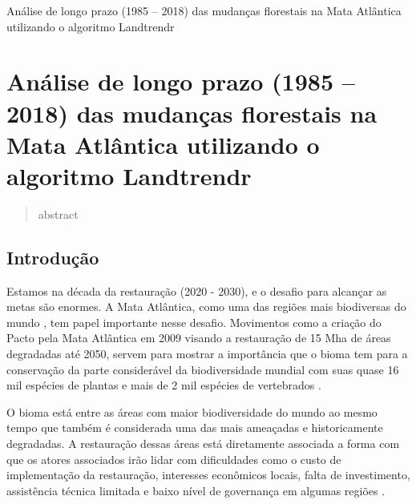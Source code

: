 \begin{titlepage}
    \centering
    \vspace*{\fill}

    \vspace*{0.5cm}

    \Large%
    Análise de longo prazo (1985 – 2018) das mudanças florestais na Mata Atlântica utilizando o algoritmo Landtrendr

    \vspace*{5cm}


    \vspace*{\fill}
\end{titlepage}

\section{Análise de longo prazo (1985 – 2018) das mudanças florestais na Mata Atlântica utilizando o algoritmo Landtrendr}

\begin{abstract}
    abstract
\end{abstract}

\subsection{Introdução}
\hspace{13pt} Estamos na década da restauração (2020 - 2030), e o desafio para alcançar as metas são enormes. A Mata Atlântica, como uma das regiões mais biodiversas do mundo \citep{REZENDE2018208}, tem papel importante nesse desafio. Movimentos como a criação do Pacto pela Mata Atlântica em 2009 visando a restauração de 15 Mha de áreas degradadas até 2050, servem para mostrar a importância que o bioma tem para a conservação da parte considerável da biodiversidade mundial com suas quase 16 mil espécies de plantas e mais de 2 mil espécies de vertebrados \citep{scarano2014}.  

O bioma está entre as áreas com maior biodiversidade do mundo ao mesmo tempo que também é considerada uma das mais ameaçadas e historicamente degradadas. A restauração dessas áreas está diretamente associada a forma com que os atores associados irão lidar com dificuldades como o custo de implementação da restauração, interesses econômicos locais, falta de investimento, assistência técnica limitada e baixo nível de governança em algumas regiões \citep{strassburg_strategic_2019, CROUZEILLES2019, Chazdon2017, Strassburg2020}. 

